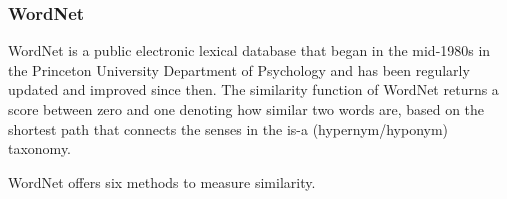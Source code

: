 \documentclass{article}
\begin{document}
\subsubsection{WordNet}
WordNet is a public electronic lexical database that began in the mid-1980s in the Princeton University Department of Psychology and has been regularly updated and improved since then. The similarity function of WordNet returns a score between zero and one denoting how similar two words are, based on the shortest path that connects the senses in the is-a (hypernym/hyponym) taxonomy. %

WordNet offers six methods to measure similarity\cite{pedersen2004wordnet}. %
\end{document}
